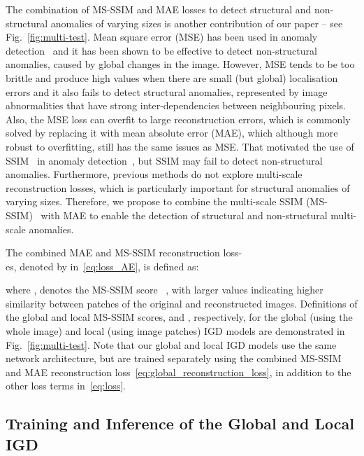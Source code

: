 \documentclass[final]{cvpr}
\begin{document}
The combination of MS-SSIM and MAE losses to detect structural and non-structural anomalies of varying sizes is another contribution of our paper -- see Fig.~\ref{fig:multi-test}.
Mean square error (MSE) has been used in anomaly detection~\cite{ren2015unsupervised,xu2015learning,ionescu2019object,gong2019memorizing,venkataramanan2019attention} and it has been shown to be effective to detect non-structural anomalies, caused by global changes in the image.
However, MSE tends to be too brittle and produce high values when there are small (but global) localisation errors and it also fails to detect structural anomalies, represented by image abnormalities that have strong inter-dependencies between neighbouring pixels.
Also, the MSE loss can overfit to large reconstruction errors, which is commonly solved by replacing it with mean absolute error (MAE), which although more robust to overfitting, still has the same issues as MSE.
That motivated the use of SSIM~\cite{SSIM} in anomaly detection~\cite{ae-ssim}, but SSIM may fail to detect non-structural anomalies. 
Furthermore, previous methods do not explore multi-scale reconstruction losses, which is particularly important for structural anomalies of varying sizes.
Therefore, we propose to combine the multi-scale SSIM (MS-SSIM)~\cite{MS-SSIM} with MAE to enable the detection of structural and non-structural multi-scale anomalies.



The combined MAE and MS-SSIM reconstruction loss-\\es, denoted by  in~\eqref{eq:loss_AE}, is defined as:

where ,  denotes the MS-SSIM score~\cite{MS-SSIM} 
, with larger values indicating higher similarity between patches  of the original and reconstructed images. Definitions of the global and local MS-SSIM scores,  and ,
respectively, for the global (using the whole image) and local (using image patches) IGD models are demonstrated in Fig.~\ref{fig:multi-test}.
Note that our global and local IGD models use the same network architecture, but are trained separately using the combined MS-SSIM and MAE reconstruction loss~\eqref{eq:global_reconstruction_loss}, in addition to the other loss terms in~\eqref{eq:loss}.  





\subsection{Training and Inference of the Global and Local IGD}
\end{document}
